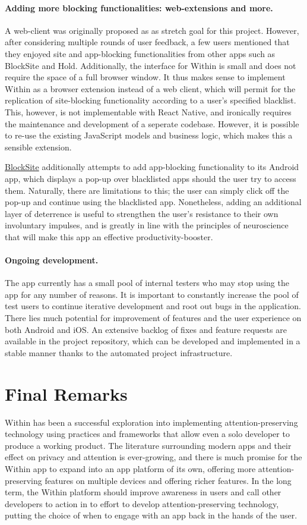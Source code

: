 \paragraph{Adding more blocking functionalities: web-extensions and more.}
A web-client was originally proposed as as stretch goal for this project. However, after considering multiple rounds of user feedback, a few users mentioned that they enjoyed site and app-blocking functionalities from other apps such as BlockSite and Hold. Additionally, the interface for Within is small and does not require the space of a full browser window. It thus makes sense to implement Within as a browser extension instead of a web client, which will permit for the replication of site-blocking functionality according to a user's specified blacklist. This, however, is not implementable with React Native, and ironically requires the maintenance and development of a seperate codebase. However, it is possible to re-use the existing JavaScript models and business logic, which makes this a sensible extension.

\href{https://blocksite.co/}{BlockSite} additionally attempts to add app-blocking functionality to its Android app, which displays a pop-up over blacklisted apps should the user try to access them. Naturally, there are limitations to this; the user can simply click off the pop-up and continue using the blacklisted app. Nonetheless, adding an additional layer of deterrence is useful to strengthen the user's resistance to their own involuntary impulses, and is greatly in line with the principles of neuroscience that will make this app an effective productivity-booster.

\paragraph{Ongoing development.} The app currently has a small pool of internal testers who may stop using the app for any number of reasons. It is important to constantly increase the pool of test users to continue iterative development and root out bugs in the application. There lies much potential for improvement of features and the user experience on both Android and iOS. An extensive backlog of fixes and feature requests are available in the project repository, which can be developed and implemented in a stable manner thanks to the automated project infrastructure.


\section{Final Remarks}
Within has been a successful exploration into implementing attention-preserving technology using practices and frameworks that allow even a solo developer to produce a working product. The literature surrounding modern apps and their effect on privacy and attention is ever-growing, and there is much promise for the Within app to expand into an app platform of its own, offering more attention-preserving features on multiple devices and offering richer features. In the long term, the Within platform should improve awareness in users and call other developers to action in to effort to develop attention-preserving technology, putting the choice of when to engage with an app back in the hands of the user.